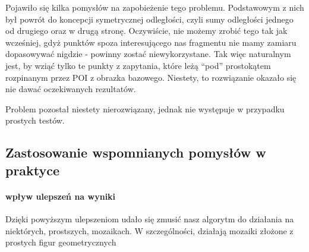 \documentclass[a4paper,12pt,leqno]{article}
\begin{document}
Pojawiło się kilka pomysłów na zapobieżenie tego problemu. Podstawowym z nich był powrót do koncepcji symetrycznej odległości, czyli sumy odległości jednego od drugiego oraz w drugą stronę.
Oczywiście, nie możemy zrobić tego tak jak wcześniej, gdyż punktów spoza interesującego nas fragmentu nie mamy zamiaru dopasowywać nigdzie - powinny zostać niewykorzystane.
Tak więc naturalnym jest, by wziąć tylko te punkty z zapytania, które leżą ``pod'' prostokątem rozpinanym przez POI z obrazka bazowego. Niestety, to rozwiązanie okazało się nie dawać 
oczekiwanych rezultatów.

Problem pozostał niestety nierozwiązany, jednak nie występuje w przypadku prostych testów.

\subsection{Zastosowanie wspomnianych pomysłów w praktyce}
\paragraph{wpływ ulepszeń na wyniki}
Dzięki powyższym ulepszeniom udało się zmusić nasz algorytm do działania na niektórych, prostszych, mozaikach. W szczególności, działają mozaiki złożone z prostych figur geometrycznych
\end{document}
